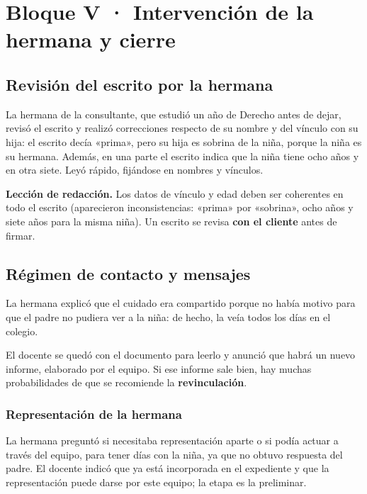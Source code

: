 \documentclass[12pt,oneside]{book}
\begin{document}
\chapter[Familia ampliada y cierre]{Bloque V · Intervención de la hermana y cierre}

\section{Revisión del escrito por la hermana}

La hermana de la consultante, que estudió un año de Derecho antes de dejar, revisó el escrito y realizó correcciones respecto de su nombre y del vínculo con su hija: el escrito decía «prima», pero su hija es sobrina de la niña, porque la niña es su hermana. Además, en una parte el escrito indica que la niña tiene ocho años y en otra siete. Leyó rápido, fijándose en nombres y vínculos.

\begin{important}
\textbf{Lección de redacción.} Los datos de vínculo y edad deben ser coherentes en todo el escrito (aparecieron inconsistencias: «prima» por «sobrina», ocho años y siete años para la misma niña). Un escrito se revisa \textbf{con el cliente} antes de firmar.
\end{important}

\section{Régimen de contacto y mensajes}

La hermana explicó que el cuidado era compartido porque no había motivo para que el padre no pudiera ver a la niña: de hecho, la veía todos los días en el colegio.

El docente se quedó con el documento para leerlo y anunció que habrá un nuevo informe, elaborado por el equipo. Si ese informe sale bien, hay muchas probabilidades de que se recomiende la \textbf{revinculación}.

\subsection{Representación de la hermana}

La hermana preguntó si necesitaba representación aparte o si podía actuar a través del equipo, para tener días con la niña, ya que no obtuvo respuesta del padre. El docente indicó que ya está incorporada en el expediente y que la representación puede darse por este equipo; la etapa es la preliminar.
\end{document}
